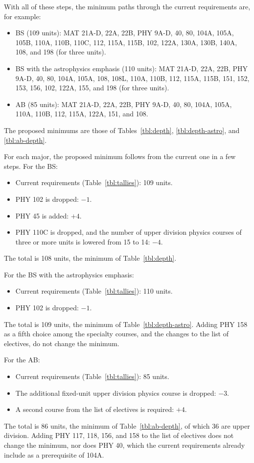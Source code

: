 \documentclass[12pt]{article}
\begin{document}
With all of these steps, the minimum paths through the current
requirements are, for example:
\begin{itemize}
\item BS (109 units):  MAT 21A-D, 22A, 22B, PHY 9A-D, 40, 80, 104A,
  105A, 105B, 110A, 110B, 110C, 112, 115A, 115B, 102, 122A, 130A,
  130B, 140A, 108, and 198 (for three units).
\item BS with the astrophysics emphasis (110 units):  MAT 21A-D, 22A,
  22B, PHY 9A-D, 40, 80, 104A, 105A, 108, 108L, 110A, 110B, 112, 115A,
  115B, 151, 152, 153, 156, 102, 122A, 155, and 198 (for three units).
\item AB (85 units):  MAT 21A-D, 22A, 22B, PHY 9A-D, 40, 80, 104A,
  105A, 110A, 110B, 112, 115A, 122A, 151, and 108.
\end{itemize}
The proposed minimums are those of Tables~\ref{tbl:depth},
\ref{tbl:depth-astro}, and \ref{tbl:ab-depth}.

For each major, the proposed minimum follows from the current one in
a few steps.  For the BS:
\begin{itemize}
\item Current requirements (Table~\ref{tbl:tallies}):  109 units.
\item PHY 102 is dropped:  $-1$.
\item PHY 45 is added:  $+4$.
\item PHY 110C is dropped, and the number of upper division physics
  courses of three or more units is lowered from 15 to 14:  $-4$.
\end{itemize}
The total is 108 units, the minimum of Table~\ref{tbl:depth}.

For the BS with the astrophysics emphasis:
\begin{itemize}
\item Current requirements (Table~\ref{tbl:tallies}):  110 units.
\item PHY 102 is dropped:  $-1$.
\end{itemize}
The total is 109 units, the minimum of Table~\ref{tbl:depth-astro}.
Adding PHY 158 as a fifth choice among the specialty courses, and the
changes to the list of electives, do not change the minimum.

For the AB:
\begin{itemize}
\item Current requirements (Table~\ref{tbl:tallies}):  85 units.
\item The additional fixed-unit upper division physics course is
  dropped:  $-3$.
\item A second course from the list of electives is required:  $+4$.
\end{itemize}
The total is 86 units, the minimum of Table~\ref{tbl:ab-depth}, of
which 36 are upper division.  Adding PHY 117, 118, 156, and 158 to the list
of electives does not change the minimum, nor does PHY 40, which the
current requirements already include as a prerequisite of 104A.

\newpage
\end{document}
